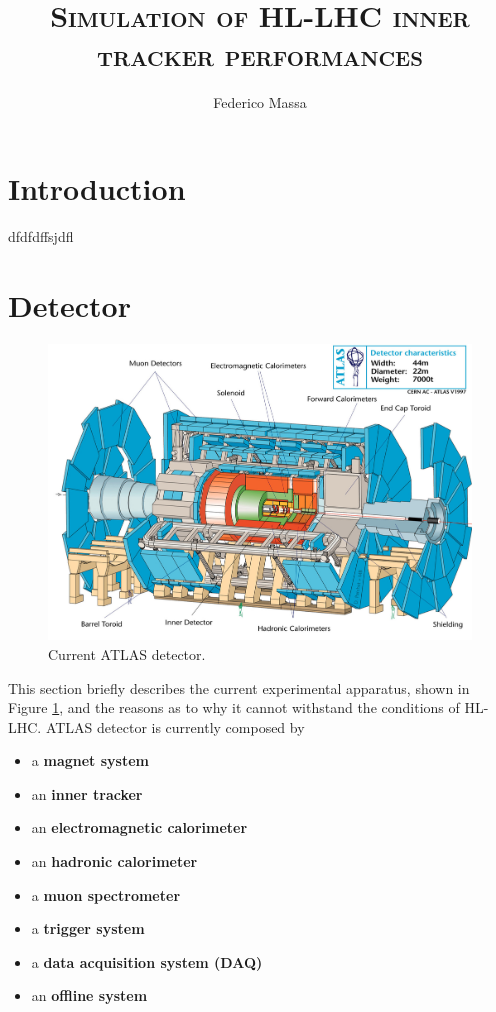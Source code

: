 \documentclass[a4paper,12pt]{article}
\title{\textsc{Simulation of HL-LHC inner tracker performances}}
\author{Federico Massa}
\begin{document}

\maketitle

\tableofcontents
\newpage

\section{Introduction} \label{Introduction}

dfdfdffsjdfl

\newpage

\section{Detector} \label{Detector}

\begin{figure} [h]
	\includegraphics[width=\textwidth]{atlasdet}
	\caption{Current ATLAS detector.}
	\label{fig:current_atlasdet}
\end{figure}

This section briefly describes the current experimental apparatus, shown in Figure \ref{fig:current_atlasdet}, and the reasons as to why it cannot withstand the conditions of HL-LHC.
\smallskip
ATLAS detector is currently composed by 
\begin{itemize}
\item a \textbf{magnet system}
\item an \textbf{inner tracker}
\item an \textbf{electromagnetic calorimeter}
\item an \textbf{hadronic calorimeter}
\item a \textbf{muon spectrometer}
\item a \textbf{trigger system}
\item a \textbf{data acquisition system (DAQ)}
\item an \textbf{offline system}
\end{itemize}
\end{document}
